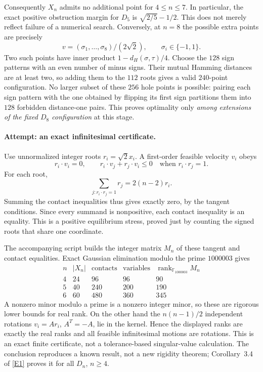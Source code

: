 \documentclass[11pt,a4paper]{article}
\newcommand{\F}{\mathbb{F}}
\newcommand{\eref}[2]{\hyperlink{extra:#1:#2}{[E#2]}}
\numberwithin{equation}{section}
\begin{document}
Consequently $X_n$ admits no additional point for $4\leq n\leq7$.
In particular, the exact positive obstruction margin for $D_5$ is
$\sqrt{2/5}-1/2$. This does not merely reflect failure of a numerical
search. Conversely, at $n=8$ the possible extra points are precisely
\[
 v=(\sigma_1,\ldots,\sigma_8)/(2\sqrt2),
 \qquad \sigma_i\in\{-1,1\}.
\]
Two such points have inner product $1-d_H(\sigma,\tau)/4$.
Choose the $128$ sign patterns with an even number of minus signs.
Their mutual Hamming distances are at least two, so adding them to the
$112$ roots gives a valid $240$-point configuration. No larger subset of
these $256$ hole points is possible: pairing each sign pattern with the
one obtained by flipping its first sign partitions them into $128$
forbidden distance-one pairs. This proves optimality only \emph{among
extensions of the fixed $D_8$ configuration} at this stage.

\paragraph{Attempt: an exact infinitesimal certificate.}
Use unnormalized integer roots $r_i=\sqrt2x_i$. A first-order feasible
velocity $v_i$ obeys
\[
 r_i\cdot v_i=0,\qquad
 r_i\cdot v_j+r_j\cdot v_i\leq0
             \quad\text{when }r_i\cdot r_j=1.
\]
For each root,
\[
 \sum_{j:r_i\cdot r_j=1}r_j=2(n-2)r_i.
\]
Summing the contact inequalities thus gives exactly zero, by the tangent
conditions. Since every summand is nonpositive, each contact inequality
is an equality. This is a positive equilibrium stress, proved just by
counting the signed roots that share one coordinate.

The accompanying script builds the integer matrix $M_n$ of these tangent
and contact equalities. Exact Gaussian elimination modulo the prime
$1000003$ gives
\[
 \begin{array}{c|r|r|r|r}
 n&|X_n|&\text{contacts}&\text{variables}&\operatorname{rank}_{\F_{1000003}}M_n\\\hline
 4&24&96&96&90\\
 5&40&240&200&190\\
 6&60&480&360&345
 \end{array}
\]
A nonzero minor modulo a prime is a nonzero integer minor, so these are
rigorous lower bounds for real rank. On the other hand the
$n(n-1)/2$ independent rotations $v_i=Ar_i$, $A^T=-A$, lie in the
kernel. Hence the displayed ranks are exactly the real ranks and all
feasible infinitesimal motions are rotations. This is an exact finite
certificate, not a tolerance-based singular-value calculation. The
conclusion reproduces a known result, not a new rigidity theorem;
Corollary~3.4 of \eref{statement}{1} proves it for all $D_n$, $n\geq4$.
\end{document}
